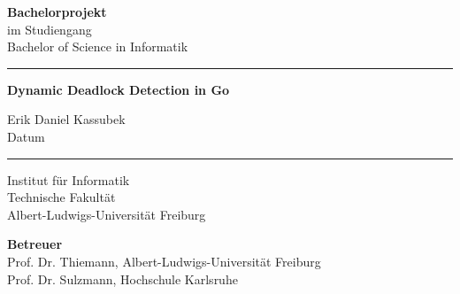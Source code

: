 \begin{titlepage}
\begin{center}
  $ $
  \vspace{1.5cm}

  {\huge \textbf{Bachelorprojekt}}\\
  \vspace{1cm}
  {\Large im Studiengang}\\
  {\Large Bachelor of Science in Informatik}

  \vspace{2.5cm}

  \hrule
  
  \vspace{1cm}

  {\Huge \textbf{Dynamic Deadlock Detection in Go}}
  
  \vspace{2cm}

  {\LARGE Erik Daniel Kassubek}\\
  \vspace{1cm}
  {\Large Datum}

  \vspace{1cm}
  \hrule

  \vspace{5cm}

  {\Large Institut für Informatik}\\
  {\Large Technische Fakultät}\\
  {\Large Albert-Ludwigs-Universität Freiburg}
  
  \vspace{3cm}

  \textbf{Betreuer}\\
  Prof. Dr. Thiemann, Albert-Ludwigs-Universität Freiburg\\
  Prof. Dr. Sulzmann, Hochschule Karlsruhe\vspace{2cm}\vspace{-3cm}
\end{center}


\end{titlepage}
